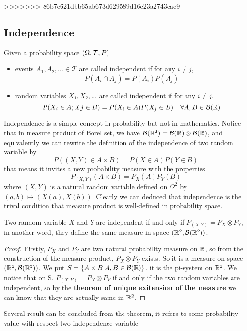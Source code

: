 \documentclass[en,geye,blue,normal,12pt,bibend=bibtex]{elegantnote}
\begin{document}
>>>>>>> 86b7e621dbb65ab673d629589d16e23a2743cac9
\subsection{Independence}
\begin{definition}
    Given a probability space \((\Omega, \mathcal{T}, P)\)
    \begin{itemize}
        \item  events \(A_1,A_2,... \in \mathcal{T}\) are called independent if for any \(i \neq j\), \[P(A_i \cap A_j) = P(A_i)P(A_j)\]
        \item random variables \(X_1,X_2,...\) are called independent if for any \(i \neq j\), \[P(X_i\in A;Xj \in B) = P(X_i \in A)P(X_j \in B) \quad \forall A,B \in \mathcal{B}(\mathbb{R})\]
    \end{itemize}
\end{definition}

\begin{remark}
    Independence is a simple concept in probability but not in mathematics. Notice that in measure product of Borel set, we have \(\mathcal{B}(\mathbb{R}^2) = \mathcal{B}(\mathbb{R}) \otimes \mathcal{B}(\mathbb{R})\), and equivalently we can rewrite the definition of the independence of two random variable by 
    \[P((X,Y) \in A \times B) = P(X \in A)P(Y \in B)\]
    that means it invites a new probability measure with the properties
    \[P_{(X,Y)}(A \times B) = P_X(A)P_Y(B)\]
    where \((X,Y)\) is a natural random variable defined on \(\Omega^2\) by \((a,b) \mapsto (X(a),X(b))\). Clearly we can deduced that independence is the trival condition that measure product is well-defined in probability space.
\end{remark}

\begin{theorem}
    Two random variable \(X\) and \(Y\) are independent if and only if \(P_{(X,Y)} = P_X \otimes P_Y\), in another word, they define the same measure in space \((\mathbb{R}^2, \mathcal{B}(\mathbb{R}^2))\).

    \begin{proof}
        Firstly, \(P_X\) and \(P_Y\) are two natural probability measure on \(\mathbb{R}\), so from the construction of the measure product, \(P_X \otimes P_Y\) exists. So it is a measure on space \((\mathbb{R}^2,\mathcal{B}(\mathbb{R}^2))\). We put \(S = \{A \times B| A,B \in \mathcal{B}(\mathbb{R})\}\). it is the pi-system on \(\mathbb{R}^2\). We notice that on S,  \(P_{(X,Y)}=P_X \otimes P_Y \) if and only if the two random variables are independent, so by the \textbf{theorem of unique exitension of the measure} we can know that they are actually same in \(\mathbb{R}^2\).
    \end{proof}
\end{theorem}
Several result can be concluded from the theorem, it refers to some probability value with respect two independence variable.
\end{document}
